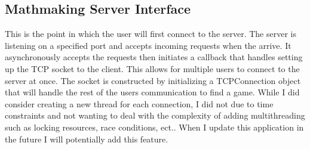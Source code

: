 \documentclass[conference]{IEEEtran}
\begin{document}
\subsection{Mathmaking Server Interface}
This is the point in which the user will first connect to the server.
The server is listening on a specified port and accepts incoming requests when the arrive. 
It asynchronously accepts the requests then initiates a callback that handles setting up the TCP socket to the client.
This allows for multiple users to connect to the server at once. 
The socket is constructed by initializing a TCPConnection object that will handle the rest of the users communication to find a game.
While I did consider creating a new thread for each connection, I did not due to time constraints and not wanting to deal with the complexity of adding multithreading such as locking resources, race conditions, ect..
When I update this application in the future I will potentially add this feature.
\end{document}
